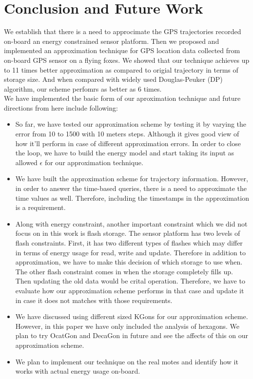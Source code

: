 \documentclass[conference]{IEEEtran}
\begin{document}
\section{Conclusion and Future Work}
We establish that there is a need to approcimate the GPS trajectories recorded on-board an energy constrained sensor platform. 
Then we proposed and implemented an approximation technique for GPS location data collected from on-board GPS sensor on 
a flying foxes. We showed that our technique achieves up to 11 times better approximation as compared to origial trajectory in 
terms of storage size. And when compared with widely used Douglas-Peuker (DP) algorithm, our scheme perfomrs as better as 
6 times.\\
We have implemented the basic form of our aproximation technique and future directions from here include following:
\begin{itemize}
\item So far, we have tested our approximation scheme by testing it by varying the error from 10 to 1500 with 10 meters steps. 
Although it gives good view of how it'll perform in case of different approximation errors. In order to close the loop, we have to 
build the energy model and start taking its input as allowed $\epsilon$ for our approximation technique.
\item We have built the approximation scheme for trajectory information. However, in order to answer the time-based queries, 
there is a need to approximate the time values as well. Therefore, including the timestamps in the approximation is a requirement. 
\item Along with energy constraint, another important constraint which we did not focus on in this work is flash storage. The sensor 
platform has two levels of flash constraints. First, it has two different types of flashes which may differ in terms of energy usage for 
read, write and update. Therefore in addition to approximation, we have to make this decision of which storage to use when. The 
other flash constraint comes in when the storage completely fills up. Then updating the old data would be crital operation. Therefore, 
we have to evaluate how our approximation scheme performs in that case and update it in case it does not matches with those 
requirements.
\item We have discussed using different sized KGons for our approximation scheme. However, in this paper we have only included 
the analysis of hexagons. We plan to try OcatGon and DecaGon in future and see the affects of this on our approximation scheme.
\item We plan to implement our technique on the real motes and identify how it works with actual energy usage on-board.
\end{itemize}
\end{document}
